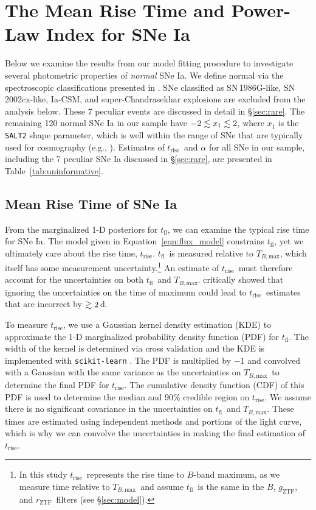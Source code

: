 \documentclass[twocolumn]{aastex63}
\newcommand{\rztf}{$r_\mathrm{ZTF}$}
\newcommand{\gztf}{$g_\mathrm{ZTF}$}
\newcommand{\tfl}{$t_\mathrm{fl}$}
\newcommand{\trise}{$t_\mathrm{rise}$}
\newcommand{\tbmax}{$T_{B,\mathrm{max}}$}
\begin{document}
\section{The Mean Rise Time and Power-Law Index for SNe
Ia}\label{sec:mean_parameters}

Below we examine the results from our model fitting procedure to investigate
several photometric properties of \textit{normal} SNe Ia. We define normal via
the spectroscopic classifications presented in \citet{Yao19}. SNe classified
as SN\,1986G-like, SN\,2002cx-like, Ia-CSM, and super-Chandrasekhar explosions
are excluded from the analysis below. These 7 peculiar events are discussed in
detail in \S\ref{sec:rare}. The remaining 120 normal SNe Ia in our sample
have $-2 \lesssim x_1 \lesssim 2$, where $x_1$ is the \texttt{SALT2} shape parameter,
which is well within the range of SNe that are typically used for cosmography
(e.g., \citealt{Scolnic18a}). Estimates of \trise\ and $\alpha$ for all SNe in
our sample, including the 7 peculiar SNe Ia discussed in \S\ref{sec:rare}, are
presented in Table~\ref{tab:uninformative}.

\subsection{Mean Rise Time of SNe Ia}\label{sec:mean_rise}

From the marginalized 1-D posteriors for \tfl, we can examine the typical rise
time for SNe Ia. The model given in Equation~\ref{eqn:flux_model} constrains
\tfl, yet we ultimately care about the rise time, \trise. \tfl\ is measured
relative to \tbmax, which itself has some measurement uncertainty.\footnote{In
this study \trise\ represents the rise time to $B$-band maximum, as we measure
time relative to \tbmax\ and assume \tfl\ is the same in the $B$, \gztf, and
\rztf\ filters (see \S\ref{sec:model}).} An estimate of \trise\ must therefore
account for the uncertainties on both \tfl\ and \tbmax. \citet{Aldering00}
critically showed that ignoring the uncertainties on the time of maximum could
lead to \trise\ estimates that are incorrect by $\gtrsim 2$\,d.

To measure \trise, we use a Gaussian kernel density estimation (KDE) to
approximate the 1-D marginalized probability density function (PDF) for \tfl.
The width of the kernel is determined via cross validation and the KDE is
implemented with \texttt{scikit-learn} \citep{Pedregosa11}. The PDF is
multiplied by $-1$ and convolved with a Gaussian with the same variance as the
uncertainties on \tbmax\ to determine the final PDF for \trise. The cumulative
density function (CDF) of this PDF is used to determine the median and 90\%
credible region on \trise. We assume there is no significant covariance in the
uncertainties on \tfl\ and \tbmax. These times are estimated using independent
methods and portions of the light curve, which is why we can convolve the
uncertainties in making the final estimation of \trise.
\end{document}
